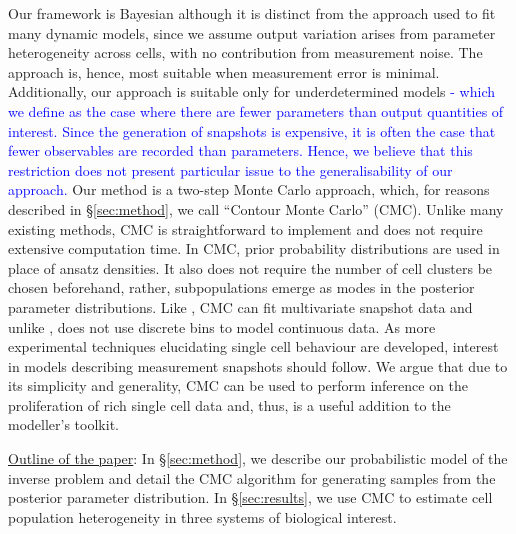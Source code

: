 Our framework is Bayesian although it is distinct from the approach used to fit many dynamic models, since we assume output variation arises from parameter heterogeneity across cells, with no contribution from measurement noise. The approach is, hence, most suitable when measurement error is minimal. Additionally, our approach is suitable only for underdetermined models \textcolor{blue}{- which we define as the case where there are fewer parameters than output quantities of interest. Since the generation of snapshots is expensive, it is often the case that fewer observables are recorded than parameters. Hence, we believe that this restriction does not present particular issue to the generalisability of our approach.} Our method is a two-step Monte Carlo approach, which, for reasons described in \S \ref{sec:method}, we call ``Contour Monte Carlo'' (CMC). Unlike many existing methods, CMC is straightforward to implement and does not require extensive computation time. In CMC, prior probability distributions are used in place of ansatz densities. It also does not require the number of cell clusters be chosen beforehand, rather, subpopulations emerge as modes in the posterior parameter distributions. Like \cite{loos2018hierarchical}, CMC can fit multivariate snapshot data and unlike \cite{dixit2018maximum}, does not use discrete bins to model continuous data. As more experimental techniques elucidating single cell behaviour are developed, interest in models describing measurement snapshots should follow. We argue that due to its simplicity and generality, CMC can be used to perform inference on the proliferation of rich single cell data and, thus, is a useful addition to the modeller's toolkit.


\underline{Outline of the paper}: In \S \ref{sec:method}, we describe our probabilistic model of the inverse problem and detail the CMC algorithm for generating samples from the posterior parameter distribution. In \S \ref{sec:results}, we use CMC to estimate cell population heterogeneity in three systems of biological interest.


